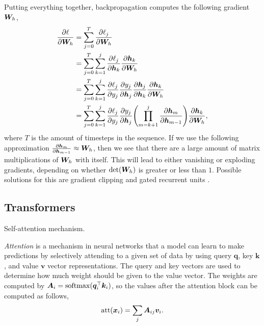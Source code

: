 Putting everything together, backpropagation computes the following gradient
\wrt $\bm{W}_h$,
\begin{align*}
    \pdv{\ell}{\mat{W}_h} & = \sum_{j=0}^T \pdv{\ell_j}{\mat{W}_h}                                                                                                                    \\
                          & = \sum_{j=0}^T \sum_{k=1}^j \pdv{\ell_j}{\vec{h}_k} \pdv{\vec{h}_k}{\mat{W}_h}                                                                            \\
                          & = \sum_{j=0}^T \sum_{k=1}^j \pdv{\ell_j}{y_j} \pdv{y_j}{\vec{h}_j} \pdv{\vec{h}_j}{\vec{h}_k} \pdv{\vec{h}_k}{\mat{W}_h}                                  \\
                          & = \sum_{j=0}^T \sum_{k=1}^j \pdv{\ell_j}{y_j} \pdv{y_j}{\vec{h}_j} \lft( \prod_{m=k+1}^j \pdv{\vec{h}_m}{\vec{h}_{m-1}} \rgt) \pdv{\vec{h}_k}{\mat{W}_h},
\end{align*}
where $T$ is the amount of timesteps in the sequence. If we use the following
approximation $\pdv{\bm{h}_m}{\bm{h}_{m-1}} \approx \bm{W}_h$, then we see
that there are a large amount of matrix multiplications of $\bm{W}_h$ with
itself. This will lead to either vanishing or exploding gradients, depending on
whether $\det{\mat{W}_h}$ is greater or less than $1$. Possible solutions for
this are gradient clipping and gated recurrent units
\citep{hochreiter1997long,cho2014learning}.

\subsection{Transformers}

\begin{marginfigure}
    \centering
    \caption{Self-attention mechanism.}
    \label{fig:attention}
\end{marginfigure}

\textit{Attention} is a mechanism in neural networks that a model can learn to
make predictions by selectively attending to a given set of data by using query
$\bm{q}$, key $\bm{k}$, and value $\bm{v}$ vector representations. The query
and key vectors are used to determine how much weight should be given to the
value vector. The weights are computed by
$\bm{A}_i=\mathrm{softmax}(\bm{q}_i^\top \bm{k}_i)$, so the values
after the attention block can be computed as follows, \[
    \mathrm{att}(\bm{x}_i) = \sum_{j} \bm{A}_{ij} \bm{v}_i.
\]

